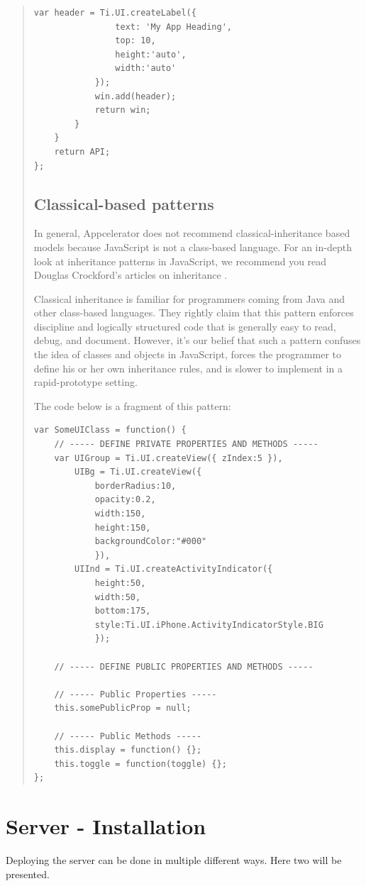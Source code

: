 \documentclass[11pt]{book}
\begin{document}
\begin{quotation}
\begin{lstlisting}[frame=single]
            var header = Ti.UI.createLabel({
                text: 'My App Heading',
                top: 10,
                height:'auto',
                width:'auto'
            });
            win.add(header);
            return win;
        }
    }
    return API;
};
\end{lstlisting}

\subsection{Classical-based patterns}
In general, Appcelerator does not recommend classical-inheritance based models because JavaScript is not a class-based language. For an in-depth look at inheritance patterns in JavaScript, we recommend you read Douglas Crockford's articles on inheritance \cite{classicalinheritance,protypalinheritance}.

Classical inheritance is familiar for programmers coming from Java and other class-based languages. They rightly claim that this pattern enforces discipline and logically structured code that is generally easy to read, debug, and document. However, it's our belief that such a pattern confuses the idea of classes and objects in JavaScript, forces the programmer to define his or her own inheritance rules, and is slower to implement in a rapid-prototype setting.

The code below is a fragment of this pattern:
\begin{lstlisting}[frame=single]
var SomeUIClass = function() {
    // ----- DEFINE PRIVATE PROPERTIES AND METHODS -----
    var UIGroup = Ti.UI.createView({ zIndex:5 }),
        UIBg = Ti.UI.createView({
            borderRadius:10,
            opacity:0.2,
            width:150,
            height:150,
            backgroundColor:"#000" 
            }),
        UIInd = Ti.UI.createActivityIndicator({
            height:50,
            width:50,
            bottom:175,
            style:Ti.UI.iPhone.ActivityIndicatorStyle.BIG
            });

    // ----- DEFINE PUBLIC PROPERTIES AND METHODS -----

    // ----- Public Properties -----
    this.somePublicProp = null;

    // ----- Public Methods -----
    this.display = function() {};
    this.toggle = function(toggle) {};
};
\end{lstlisting}
\end{quotation}

\section{Server - Installation}
Deploying the server can be done in multiple different ways. Here two will be presented.
\end{document}
